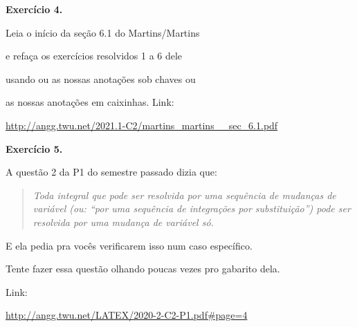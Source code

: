 \documentclass[oneside,12pt]{article}
\begin{document}
\bsk
\bsk

{\bf Exercício 4.}

Leia o início da seção 6.1 do Martins/Martins

e refaça os exercícios resolvidos 1 a 6 dele

usando ou as nossas anotações sob chaves ou

as nossas anotações em caixinhas. Link:

\ssk

{\scriptsize

\url{http://angg.twu.net/2021.1-C2/martins_martins__sec_6.1.pdf}

}


\newpage


{\bf Exercício 5.}

\msk

A questão 2 da P1 do semestre passado dizia que:
%
\begin{quote}
{\sl Toda integral que pode ser resolvida por uma sequência de
  mudanças de variável (ou: ``por uma sequência de integrações por
  substituição'') pode ser resolvida por uma mudança de variável só.}
\end{quote}

E ela pedia pra vocês verificarem isso num caso específico.

Tente fazer essa questão olhando poucas vezes pro gabarito dela.

Link:

\ssk

{\footnotesize

\url{http://angg.twu.net/LATEX/2020-2-C2-P1.pdf#page=4}

}




\newpage
\end{document}
